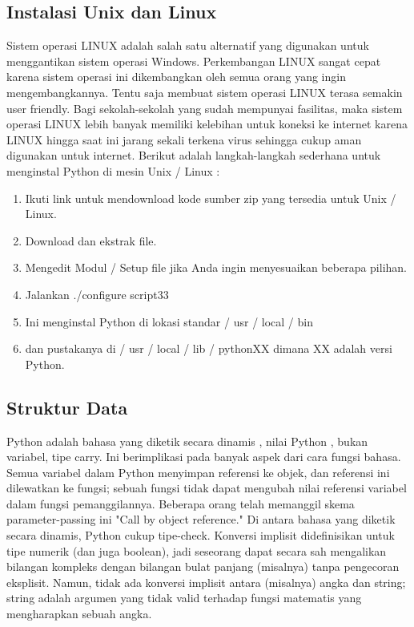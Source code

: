 \subsection{Instalasi Unix dan Linux}
Sistem operasi LINUX adalah salah satu alternatif yang digunakan untuk menggantikan sistem operasi Windows. Perkembangan LINUX sangat cepat karena sistem operasi ini dikembangkan oleh semua orang yang ingin mengembangkannya. Tentu saja membuat sistem operasi LINUX terasa semakin user friendly. Bagi sekolah-sekolah yang sudah mempunyai fasilitas, maka sistem operasi LINUX lebih banyak memiliki kelebihan untuk koneksi ke internet karena LINUX hingga saat ini jarang sekali terkena virus sehingga cukup aman digunakan untuk internet.
Berikut adalah langkah-langkah sederhana untuk menginstal Python di mesin Unix / Linux :
\begin{enumerate}
\item Ikuti link untuk mendownload kode sumber zip yang tersedia untuk Unix / Linux.
\item Download dan ekstrak file.
\item Mengedit Modul / Setup file jika Anda ingin menyesuaikan beberapa pilihan.
\item Jalankan ./configure script33
\item Ini menginstal Python di lokasi standar / usr / local / bin
\item dan pustakanya di / usr / local / lib / pythonXX dimana XX adalah versi Python.
\end{enumerate}

\subsection{Struktur Data}
Python adalah bahasa yang diketik secara dinamis , nilai Python , bukan variabel, tipe carry. Ini berimplikasi pada banyak aspek dari cara fungsi bahasa.
Semua variabel dalam Python menyimpan referensi ke objek, dan referensi ini dilewatkan ke fungsi; sebuah fungsi tidak dapat mengubah nilai referensi variabel dalam fungsi pemanggilannya. Beberapa orang telah memanggil skema parameter-passing ini "Call by object reference."
Di antara bahasa yang diketik secara dinamis, Python cukup tipe-check. Konversi implisit didefinisikan untuk tipe numerik (dan juga boolean), jadi seseorang dapat secara sah mengalikan bilangan kompleks dengan bilangan bulat panjang (misalnya) tanpa pengecoran eksplisit. Namun, tidak ada konversi implisit antara (misalnya) angka dan string; string adalah argumen yang tidak valid terhadap fungsi matematis yang mengharapkan sebuah angka.

